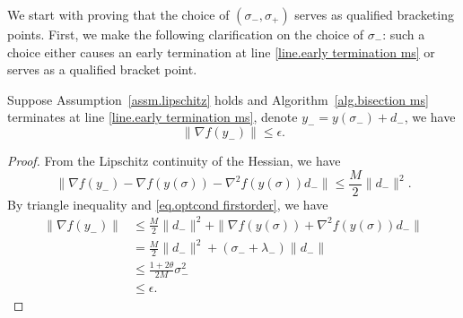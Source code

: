 \documentclass{mcom-l}
\numberwithin{equation}{section}
\begin{document}
We start with proving that the choice of $(\sigma_-,\sigma_+)$ serves as qualified bracketing points. First, we make the following clarification on the choice of $\sigma_-$: such a choice either causes an early termination at line \ref{line.early termination ms} or serves as a qualified bracket point.
\begin{lemma}
    \label{lem.early termination ms}
    Suppose Assumption~\ref{assm.lipschitz} holds and Algorithm~\ref{alg.bisection ms} terminates at line \ref{line.early termination ms}, denote $y_- = y(\sigma_-)+d_-$, we have
    \begin{equation*}
        \|\nabla f(y_-) \|\leq \epsilon.
    \end{equation*}
\end{lemma}
\begin{proof}
    From the Lipschitz continuity of the Hessian, we have
    \begin{equation*}
        \|\nabla f(y_-)-\nabla f(y(\sigma))-\nabla^2 f(y(\sigma))d_-\|\leq \frac{M}{2}\|d_-\|^2.
    \end{equation*}
    By triangle inequality and \eqref{eq.optcond firstorder}, we have
    \begin{equation*}
        \begin{aligned}
            \|\nabla f(y_-)\| & \leq \frac{M}{2}\|d_-\|^2+\| \nabla f(y(\sigma))+\nabla^2 f(y(\sigma))d_-\| \\
                              & = \frac{M}{2}\|d_-\|^2+(\sigma_-+\lambda_-) \|d_-\|                         \\
                              & \leq \frac{1+2\theta}{2M}\sigma_-^2                                         \\
                              & \leq \epsilon.
        \end{aligned}
    \end{equation*}
\end{proof}
\end{document}
